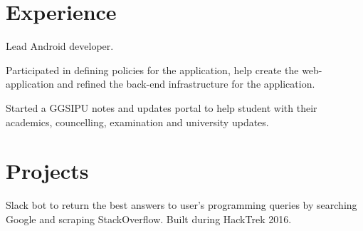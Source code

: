\documentclass[a4paper]{deedy-resume} %
\begin{document}
\begin{minipage}[t]{0.66\textwidth} %


\section{Experience}


\vspace{\topsep} %
\begin{tightitemize}
\item Lead Android developer. 
\item Participated in defining policies for the application, help create the web-application and refined the back-end infrastructure for the application.
\end{tightitemize}

\sectionspace %



\begin{tightitemize}
\item Started a GGSIPU notes and updates portal to help student with their academics, councelling,
examination and university updates.

\end{tightitemize}

\sectionspace %


\section{Projects}


Slack bot to return the best answers to user's programming queries by searching Google and scraping StackOverflow. Built during HackTrek 2016.
\sectionspace %


\end{minipage}
\end{document}
